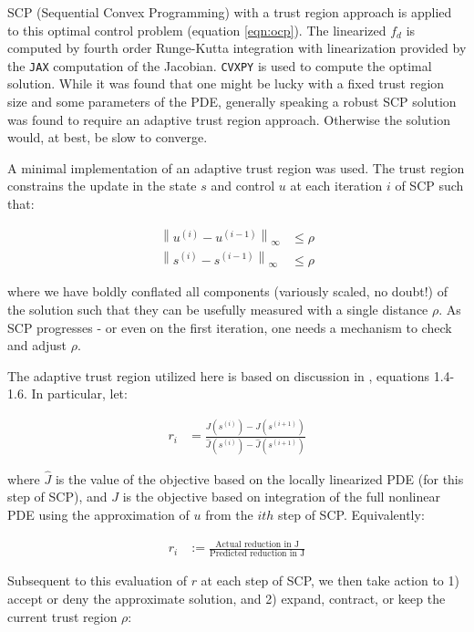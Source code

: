 \documentclass[11pt]{article}
\newcommand{\normnew}[2]{\left \lVert #1 \right \rVert_{#2}}
\begin{document}
SCP (Sequential Convex Programming) with a trust region approach is applied to this optimal control problem (equation \ref{eqn:ocp}). The linearized $f_d$ is computed by fourth order Runge-Kutta integration with linearization provided by the \texttt{JAX} computation of the Jacobian. \texttt{CVXPY} is used to compute the optimal solution. While it was found that one might be lucky with a fixed trust region size and some parameters of the PDE, generally speaking a robust SCP solution was found to require an adaptive trust region approach. Otherwise the solution would, at best, be slow to converge.

A minimal implementation of an adaptive trust region was used. The trust region constrains the update in the state $s$ and control $u$ at each iteration $i$ of SCP such that:

\begin{align}
\normnew{u^{(i)} - u^{(i-1)}}{\infty} &\leq \rho \nonumber \\
\normnew{s^{(i)} - s^{(i-1)}}{\infty} &\leq \rho \nonumber 
\end{align}

where we have boldly conflated all components (variously scaled, no doubt!) of the solution such that they can be usefully measured with a single distance $\rho$. As SCP progresses - or even on the first iteration, one needs a mechanism to check and adjust $\rho$.

The adaptive trust region utilized here is based on discussion in \cite{R6}, equations 1.4-1.6. In particular, let:

\begin{align}
r_{i} &= \frac{J(s^{(i)}) - J(s^{(i+1)})}{\hat{J}(s^{(i)}) - \hat{J}(s^{(i+1)})}
\end{align}

where $\hat{J}$ is the value of the objective based on the locally linearized PDE (for this step of SCP), and $J$ is the objective based on integration of the full nonlinear PDE using the approximation of $u$ from the $ith$ step of SCP. Equivalently:

\begin{align}
r_i &:= \frac{\text{Actual reduction in J}}{\text{Predicted reduction in J}}
\end{align}

Subsequent to this evaluation of $r$ at each step of SCP, we then take action to 1) accept or deny the approximate solution, and 2) expand, contract, or keep the current trust region $\rho$:
\end{document}
